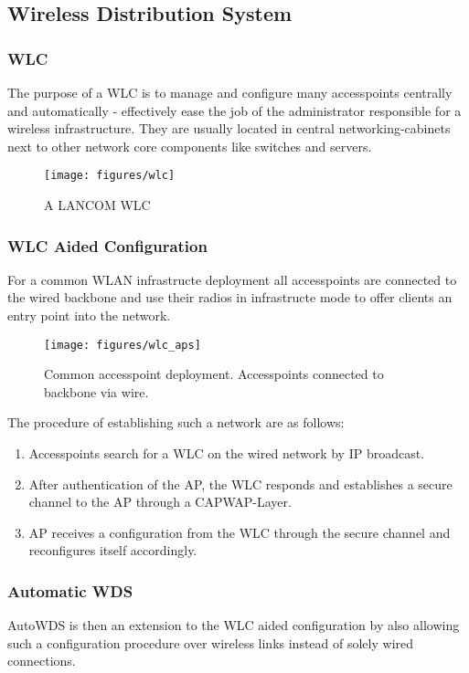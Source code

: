     \subsection{Wireless Distribution System}
      
      \subsubsection{\ac{WLC}}
	The purpose of a \ac{WLC} is to manage and configure many accesspoints centrally and automatically - effectively ease the job of the administrator responsible for a 
	wireless infrastructure. They are usually located in central networking-cabinets next to other network core components like switches and servers.
	\begin{figure}[h!]
	  \centering
	  \texttt{[image: figures/wlc]}
	  \caption{A LANCOM \ac{WLC}}
	  \label{fig:wlc}
	\end{figure}
      
      \subsubsection{WLC Aided Configuration}
	For a common WLAN infrastructe deployment all accesspoints are connected to the wired backbone and use their radios in infrastructe mode to 
	offer clients an entry point into the network.
	\begin{figure}[h!]
	  \centering
	  \texttt{[image: figures/wlc\_aps]}
	  \caption{Common accesspoint deployment. Accesspoints connected to backbone via wire.}
	  \label{fig:wlc_aps}
	\end{figure}
	The procedure of establishing such a network are as follows:
	\begin{enumerate}
	 \item Accesspoints search for a \ac{WLC} on the wired network by IP broadcast.
	 \item After authentication of the \ac{AP}, the \ac{WLC} responds and establishes a secure channel to the \ac{AP} through a \ac{CAPWAP}-Layer.
	 \item \ac{AP} receives a configuration from the \ac{WLC} through the secure channel and reconfigures itself accordingly.
	\end{enumerate}
	
      \subsubsection{Automatic \ac{WDS}}
      AutoWDS is then an extension to the WLC aided configuration by also allowing such a configuration procedure over wireless links instead of solely wired connections.
            
